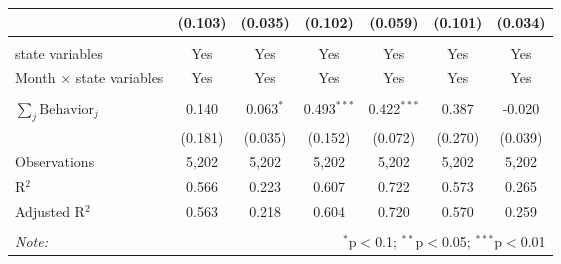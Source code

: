 \begin{tabular}{@{\extracolsep{1pt}}lcccccc}
  & (0.103) & (0.035) & (0.102) & (0.059) & (0.101) & (0.034) \\ 
 \hline \\[-1.8ex] 
state variables & Yes & Yes & Yes & Yes & Yes & Yes \\ 
Month $\times$ state variables & Yes & Yes & Yes & Yes & Yes & Yes \\ 
\hline \\[-1.8ex] 
$\sum_j \mathrm{Behavior}_j$ & 0.140 & 0.063$^{*}$ & 0.493$^{***}$ & 0.422$^{***}$ & 0.387 & -0.020 \\ 
 & (0.181) & (0.035) & (0.152) & (0.072) & (0.270) & (0.039) \\ 
Observations & 5,202 & 5,202 & 5,202 & 5,202 & 5,202 & 5,202 \\ 
R$^{2}$ & 0.566 & 0.223 & 0.607 & 0.722 & 0.573 & 0.265 \\ 
Adjusted R$^{2}$ & 0.563 & 0.218 & 0.604 & 0.720 & 0.570 & 0.259 \\ 
\hline 
\hline \\[-1.8ex] 
\textit{Note:}  & \multicolumn{6}{r}{$^{*}$p$<$0.1; $^{**}$p$<$0.05; $^{***}$p$<$0.01} \\ 
\end{tabular} 